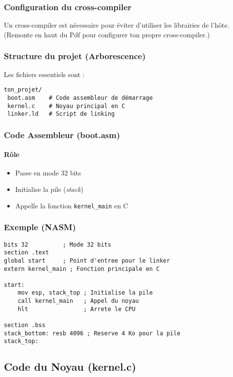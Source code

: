 \documentclass{article}
\begin{document}
\subsubsection{Configuration du cross-compiler}
Un cross-compiler est nécessaire pour éviter d'utiliser les librairies de l'hôte.\\
    (Remonte en haut du Pdf pour configurer ton propre cross-compiler.)

\subsubsection{Structure du projet (Arborescence)}
Les fichiers essentiels sont :

\begin{verbatim}
ton_projet/
 boot.asm    # Code assembleur de démarrage
 kernel.c    # Noyau principal en C
 linker.ld   # Script de linking
\end{verbatim}

\subsubsection{Code Assembleur (boot.asm)}
\paragraph{Rôle}
\begin{itemize}
    \item Passe en mode 32 bits
    \item Initialise la pile (\textit{stack})
    \item Appelle la fonction \texttt{kernel\_main} en C
\end{itemize}

\subsubsection{Exemple (NASM)}
\begin{lstlisting}[language=assembler]
bits 32          ; Mode 32 bits
section .text
global start     ; Point d'entree pour le linker
extern kernel_main ; Fonction principale en C

start:
    mov esp, stack_top ; Initialise la pile
    call kernel_main   ; Appel du noyau
    hlt                ; Arrete le CPU

section .bss
stack_bottom: resb 4096 ; Reserve 4 Ko pour la pile
stack_top:
\end{lstlisting}

\subsection{Code du Noyau (kernel.c)}
\end{document}
